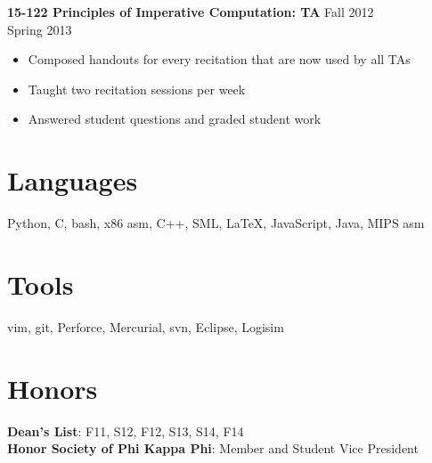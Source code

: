 \documentclass[margin]{res}
\begin{document}
\begin{resume}
  \textbf{15-122 Principles of Imperative Computation: TA}
    \hfill Fall 2012\\ \hphantom{1em} \hfill Spring 2013

  \vspace{-1em}\vspace{-1ex}
  \begin{itemize} \itemsep -2pt
    \item Composed handouts for every recitation that are now used by all TAs
    \item Taught two recitation sessions per week
    \item Answered student questions and graded student work
  \end{itemize}

\section{Languages}
  Python, C, bash, x86 asm, C++, SML, \LaTeX, JavaScript, Java, MIPS asm

\section{Tools}
  vim, git, Perforce, Mercurial, svn, Eclipse, Logisim

\section{Honors}
  \textbf{Dean's List}: F11, S12, F12, S13, S14, F14 \\
  \textbf{Honor Society of Phi Kappa Phi}: Member and Student Vice President
\end{resume}
\end{document}
